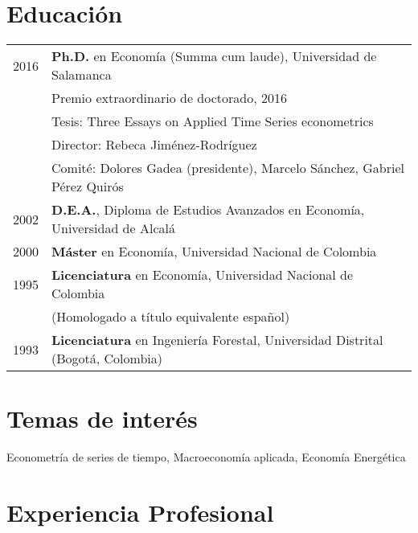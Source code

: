 \documentclass[11pt]{article}\usepackage[]{graphicx}\usepackage[]{color}
\begin{document}
\section{Educación} 

\begin{tabular}{rl{-2cm}} %

2016 & \textbf{Ph.D.} en Economía (Summa cum laude), Universidad de Salamanca\\
& Premio extraordinario de doctorado, 2016\\
& Tesis: Three Essays on Applied Time Series econometrics\\
& Director: Rebeca Jiménez-Rodríguez\\
& Comité: Dolores Gadea (presidente), Marcelo Sánchez, Gabriel Pérez Quirós\\

2002 & \textbf{D.E.A.}, Diploma de Estudios Avanzados en Economía, Universidad de Alcalá\\
	 
2000 & \textbf{Máster} en Economía, Universidad Nacional de Colombia\\

1995 & \textbf{Licenciatura} en Economía, Universidad Nacional de Colombia\\
& (Homologado a título equivalente español)\\

1993 & \textbf{Licenciatura} en Ingeniería Forestal, Universidad Distrital (Bogotá, Colombia)\\

\end{tabular}
\vspace{10pt}

\section{Temas de interés}

Econometría de series de tiempo, Macroeconomía aplicada, Economía Energética

\section{Experiencia Profesional} 
\end{document}
